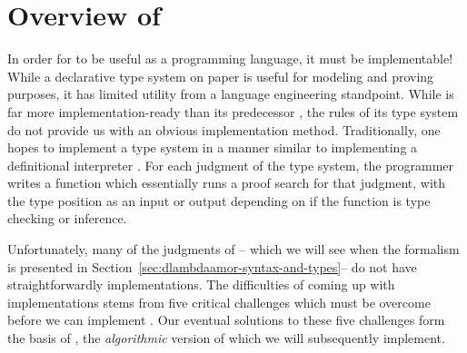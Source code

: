 


\section{Overview of \bilambdaamor}
\label{sec:bilambdaamor-overview}
In order for \dlambdaamor to be useful as a programming language, it must be implementable! While a declarative type system on paper is useful for modeling and proving purposes, it has limited utility from a language engineering standpoint. While \dlambdaamor is far more implementation-ready than its predecessor \lambdaamor, the rules of its type system do not provide us with an obvious implementation method. Traditionally, one hopes to implement a type system in a manner similar to implementing a definitional interpreter \cite{reynolds:acm72}. For each judgment of the type system, the programmer writes a function which essentially runs a proof search for that judgment, with the type position as an input or output depending on if the function is type checking or inference.

Unfortunately, many of the judgments of \dlambdaamor -- which we will see when the formalism is presented in Section~\ref{sec:dlambdaamor-syntax-and-types}-- do not have straightforwardly implementations. The difficulties of coming up with implementations stems from five critical challenges which must be overcome before we can implement \dlambdaamor. Our eventual solutions to these five challenges form the basis of \bilambdaamor, the \textit{algorithmic} version of \dlambdaamor which we will subsequently implement.


